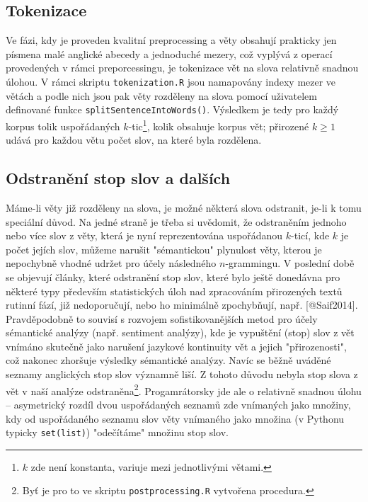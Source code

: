 \subsection{Tokenizace}

Ve fázi, kdy je proveden kvalitní preprocessing a věty obsahují prakticky jen písmena malé anglické abecedy a jednoduché mezery, což vyplývá z operací provedených v rámci preporcessingu, je tokenizace vět na slova relativně snadnou úlohou. V rámci skriptu \texttt{tokenization.R} jsou namapovány indexy mezer ve větách a podle nich jsou pak věty rozděleny na slova pomocí uživatelem definované funkce \texttt{splitSentenceIntoWords()}. Výsledkem je tedy pro každý korpus tolik uspořádaných $k$-tic\footnote{$k$ zde není konstanta, variuje mezi jednotlivými větami.}, kolik obsahuje korpus vět; přirozené $k \geq 1$ udává pro každou větu počet slov, na které byla rozdělena.



\subsection{Odstranění stop slov a dalších}

Máme-li věty již rozděleny na slova, je možné některá slova odstranit, je-li k tomu speciální důvod. Na jedné straně je třeba si uvědomit, že odstraněním jednoho nebo více slov z věty, která je nyní reprezentována uspořádanou $k$-ticí, kde $k$ je počet jejích slov, můžeme narušit "sémantickou" plynulost věty, kterou je nepochybně vhodné udržet pro účely následného $n$-grammingu. V poslední době se objevují články, které odstranění stop slov, které bylo ještě donedávna pro některé typy především statistických úloh nad zpracováním přirozených textů rutinní fází, již nedoporučují, nebo ho minimálně zpochybňují, např. [@Saif2014]. Pravděpodobně to souvisí s rozvojem sofistikovanějších metod pro účely sémantické analýzy (např. sentiment analýzy), kde je vypuštění (stop) slov z vět vnímáno skutečně jako narušení jazykové kontinuity vět a jejich "přirozenosti", což nakonec zhoršuje výsledky sémantické analýzy. Navíc se běžně uváděné seznamy anglických stop slov významně liší. Z tohoto důvodu nebyla stop slova z vět v naší analýze odstraněna\footnote{Byť je pro to ve skriptu \texttt{postprocessing.R} vytvořena procedura.}. Progamrátorsky jde ale o relativně snadnou úlohu -- asymetrický rozdíl dvou uspořádaných seznamů zde vnímaných jako množiny, kdy od uspořádaného seznamu slov věty vnímaného jako množina (v Pythonu typicky \texttt{set(list)}) "odečítáme" množinu stop slov.

